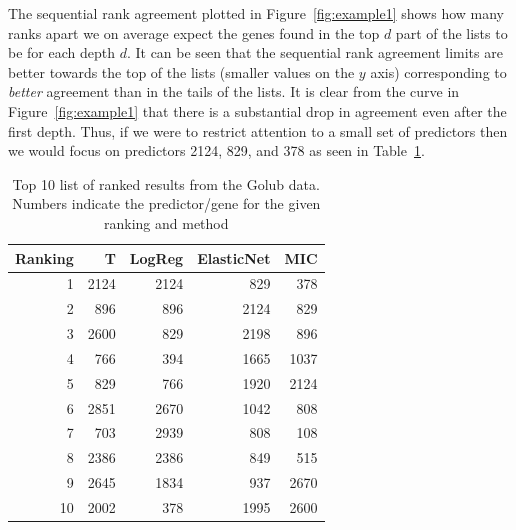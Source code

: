 \documentclass[12pt,a4paper]{article}
\theoremstyle{plain}
\begin{document}
The sequential rank agreement plotted in Figure~\ref{fig:example1}
shows how many ranks apart we on average expect the genes found in the
top $d$ part of the lists to be for each depth $d$.  It can be seen
that the sequential rank agreement limits are better towards the top
of the lists (smaller values on the $y$ axis) corresponding to
\emph{better} agreement than in the tails of the lists. It is clear
from the curve in Figure~\ref{fig:example1} that there is a
substantial drop in agreement even after the first depth. Thus, if we
were to restrict attention to a small set of predictors then we would
focus on predictors 2124, 829, and 378 as seen in Table~\ref{tab1}.


\begin{table}[tb]
\centering
\caption{Top 10 list of ranked results from the Golub data. Numbers indicate the predictor/gene for the given ranking and method} 
\label{tab1}
\begin{tabular}{rrrrr}
  \hline
Ranking & T & LogReg & ElasticNet & MIC \\ 
  \hline
1 & 2124 & 2124 & 829 & 378 \\ 
  2 & 896 & 896 & 2124 & 829 \\ 
  3 & 2600 & 829 & 2198 & 896 \\ 
  4 & 766 & 394 & 1665 & 1037 \\ 
  5 & 829 & 766 & 1920 & 2124 \\ 
  6 & 2851 & 2670 & 1042 & 808 \\ 
  7 & 703 & 2939 & 808 & 108 \\ 
  8 & 2386 & 2386 & 849 & 515 \\ 
  9 & 2645 & 1834 & 937 & 2670 \\ 
  10 & 2002 & 378 & 1995 & 2600 \\ 
   \hline
\end{tabular}
\end{table}

\end{document}
